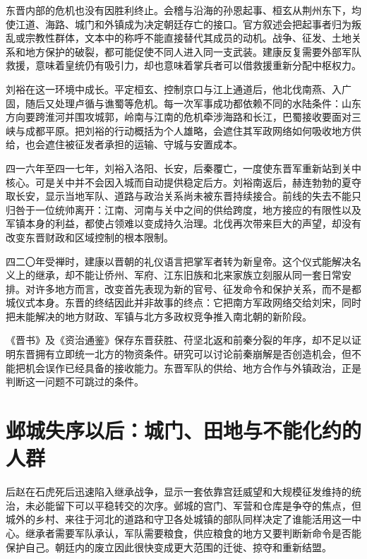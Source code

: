 东晋内部的危机也没有因胜利终止。会稽与沿海的孙恩起事、桓玄从荆州东下，均使江道、海路、城门和外镇成为决定朝廷存亡的接口。官方叙述会把起事者归为叛乱或宗教性群体，文本中的称呼不能直接替代其成员的动机。战争、征发、土地关系和地方保护的破裂，都可能促使不同人进入同一支武装。建康反复需要外部军队救援，意味着皇统仍有吸引力，却也意味着掌兵者可以借救援重新分配中枢权力。

刘裕在这一环境中成长。平定桓玄、控制京口与江上通道后，他北伐南燕、入广固，随后又处理卢循与谯蜀等危机。每一次军事成功都依赖不同的水陆条件：山东方向要跨淮河并围攻城郭，岭南与江南的危机牵涉海路和长江，巴蜀接收要面对三峡与成都平原。把刘裕的行动概括为个人雄略，会遮住其军政网络如何吸收地方供给，也会遮住被征发者承担的运输、守城与安置成本。

四一六年至四一七年，刘裕入洛阳、长安，后秦覆亡，一度使东晋军重新站到关中核心。可是关中并不会因入城而自动提供稳定后方。刘裕南返后，赫连勃勃的夏夺取长安，显示当地军队、道路与政治关系尚未被东晋持续接合。前线的失去不能只归咎于一位统帅离开：江南、河南与关中之间的供给跨度，地方接应的有限性以及军镇本身的利益，都使占领难以变成持久治理。北伐再次带来巨大的声望，却没有改变东晋财政和区域控制的根本限制。

四二〇年受禅时，建康以晋朝的礼仪语言把掌军者转为新皇帝。这个仪式能解决名义上的继承，却不能让侨州、军府、江东旧族和北来家族立刻服从同一套日常安排。对许多地方而言，改变首先表现为新的官号、征发命令和保护关系，而不是都城仪式本身。东晋的终结因此并非故事的终点：它把南方军政网络交给刘宋，同时把未能解决的地方财政、军镇与北方多政权竞争推入南北朝的新阶段。

\begin{debate}
《晋书》及《资治通鉴》保存东晋获胜、苻坚北返和前秦分裂的年序，却不足以证明东晋拥有立即统一北方的物资条件。研究可以讨论前秦崩解是否创造机会，但不能把机会误作已经具备的接收能力。东晋军队的供给、地方合作与外镇政治，正是判断这一问题不可跳过的条件。
\end{debate}

\section{邺城失序以后：城门、田地与不能化约的人群}
\label{sec:eastern-jin-depth-ye}

后赵在石虎死后迅速陷入继承战争，显示一套依靠宫廷威望和大规模征发维持的统治，未必能留下可以平稳转交的次序。邺城的宫门、军营和仓库是争夺的焦点，但城外的乡村、来往于河北的道路和守卫各处城镇的部队同样决定了谁能活用这一中心。继承者需要军队承认，军队需要粮食，供应粮食的地方又要判断新命令是否能保护自己。朝廷内的废立因此很快变成更大范围的迁徙、掠夺和重新结盟。

